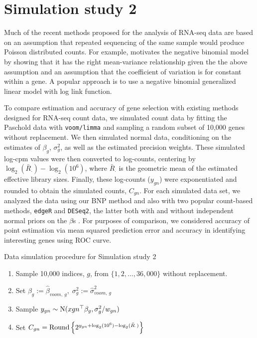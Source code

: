 \section{Simulation study 2}
Much of the recent methods proposed for the analysis of RNA-seq data are based on an assumption that repeated sequencing of the same sample would produce Poisson distributed counts. For example, \cite{mccarthy} motivates the negative binomial model by showing that it has the right mean-variance relationship given the the above assumption and an assumption that the coefficient of variation is for constant within a gene. A popular approach is to use a negative binomial generalized linear model with log link function.

To compare estimation and accuracy of gene selection with existing methods designed for RNA-seq count data, we simulated count data by fitting the Paschold data with \texttt{voom/limma} and sampling a random subset of 10,000 genes without replacement. We then simulated normal data, conditioning on the estimates of $\beta_g$, $\sigma^2_g$, as well as the estimated precision weights. These simulated log-cpm values were then converted to log-counts, centering by $\log_2(\bar{R}_\cdot)-\log_2(10^6)$, where $\bar{R}_\cdot$ is the geometric mean of the estimated effective library sizes. Finally, these log-counts ($y_{gn}$) were exponentiated and rounded to obtain the simulated counts, $C_{gn}$. For each simulated data set, we analyzed the data using our BNP method and also with two popular count-based methods, \texttt{edgeR} and \texttt{DESeq2}, the latter both with and without independent normal priors on the $\beta$s \citep{edger2010,deseq2014}. For purposes of comparison, we considered accuracy of point estimation via mean squared prediction error and accuracy in identifying interesting genes using ROC curve.
\begin{table}
\caption{Data simulation procedure for Simulation study 2}
\begin{enumerate}
\item Sample 10,000 indices, $g$, from $\{1,2,\ldots,36,000\}$ without replacement.
\item Set $\beta_g:= \hat{\beta}_{voom,~g},\; \sigma^2_g:= \hat{\sigma}^2_{voom,~g}$
\item Sample $y_{gn} \sim \operatorname{N}(x{gn}^\top\beta_g, \sigma^2_g/w_{gn})$
\item Set $C_{gn} = \operatorname{Round} \left\{ 2^{y_{gn} + \log_2(10^6) - \log_2(\bar{R}_{\cdot})} \right\}$
\end{enumerate}
\end{table}


